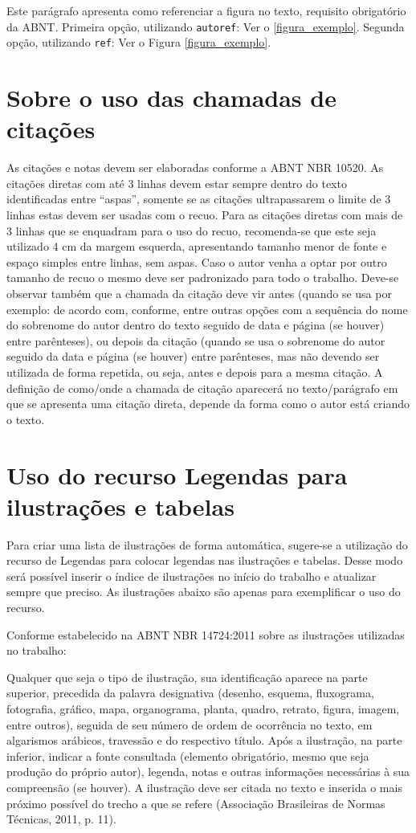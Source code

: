 \documentclass[
	12pt,				%
	openright,			%
	oneside,			%
	a4paper,			%
	english,			%
	french,				%
	spanish,			%
	brazil				%
	]{abntex2UFMT}
\begin{document}
Este parágrafo apresenta como referenciar a figura no texto, requisito
obrigatório da ABNT. 
Primeira opção, utilizando \texttt{autoref}: Ver o \autoref{figura_exemplo}. 
Segunda opção, utilizando  \texttt{ref}: Ver o Figura \ref{figura_exemplo}.

\section{Sobre o uso das chamadas de citações}
As citações e notas devem ser elaboradas conforme a ABNT NBR 10520. As citações diretas com até 3 linhas devem estar sempre dentro do texto identificadas entre “aspas”, somente se as citações ultrapassarem o limite de 3 linhas estas devem ser usadas com o recuo. Para as citações diretas com mais de 3 linhas que se enquadram para o uso do recuo, recomenda-se que este seja utilizado 4 cm da margem esquerda, apresentando tamanho menor de fonte e espaço simples entre linhas, sem aspas. Caso o autor venha a optar por outro tamanho de recuo o mesmo deve ser padronizado para todo o trabalho. Deve-se observar também que a chamada da citação deve vir antes (quando se usa por exemplo: de acordo com, conforme, entre outras opções com a sequência do nome do sobrenome do autor dentro do texto seguido de data e página (se houver) entre parênteses), ou depois da citação (quando se usa o sobrenome do autor seguido da data e página (se houver) entre parênteses, mas não devendo ser utilizada de forma repetida, ou seja, antes e depois para a mesma citação. A definição de como/onde a chamada de citação aparecerá no texto/parágrafo em que se apresenta uma citação direta, depende da forma como o autor está criando o texto.

\section{Uso do recurso Legendas para ilustrações e tabelas}
Para criar uma lista de ilustrações de forma automática, sugere-se a utilização do recurso de Legendas para colocar legendas nas ilustrações e tabelas. Desse modo será possível inserir o índice de ilustrações no início do trabalho e atualizar sempre que preciso. As ilustrações abaixo são apenas para exemplificar o uso do recurso.

Conforme estabelecido na ABNT NBR 14724:2011 sobre as ilustrações utilizadas no trabalho:
\begin{citacao}
Qualquer que seja o tipo de ilustração, sua identificação aparece na parte superior, precedida da palavra designativa (desenho, esquema, fluxograma, fotografia, gráfico, mapa, organograma, planta, quadro, retrato, figura, imagem, entre outros), seguida de seu número de ordem de ocorrência no texto, em algarismos arábicos, travessão e do respectivo título. Após a ilustração, na parte inferior, indicar a fonte consultada (elemento obrigatório, mesmo que seja produção do próprio autor), legenda, notas e outras informações necessárias à sua compreensão (se houver). A ilustração deve ser citada no texto e inserida o mais próximo possível do trecho a que se refere (Associação Brasileiras de Normas Técnicas, 2011, p. 11).
\end{citacao}
\end{document}
